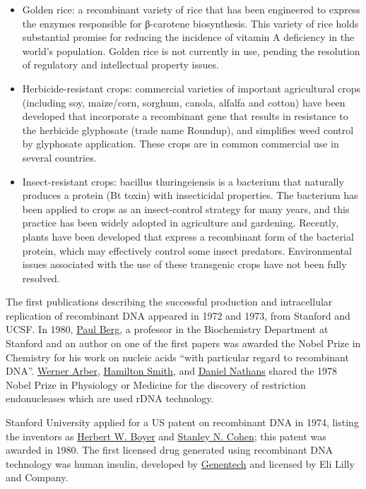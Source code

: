 \begin{itemize}
\item
  Golden rice: a recombinant variety of rice that has been engineered to express the enzymes responsible for β-carotene biosynthesis. This variety of rice holds substantial promise for reducing the incidence of vitamin A deficiency in the world's population. Golden rice is not currently in use, pending the resolution of regulatory and intellectual property issues.
\item
  Herbicide-resistant crops: commercial varieties of important agricultural crops (including soy, maize/corn, sorghum, canola, alfalfa and cotton) have been developed that incorporate a recombinant gene that results in resistance to the herbicide glyphosate (trade name Roundup), and simplifies weed control by glyphosate application. These crops are in common commercial use in several countries.
\item
  Insect-resistant crops: bacillus thuringeiensis is a bacterium that naturally produces a protein (Bt toxin) with insecticidal properties. The bacterium has been applied to crops as an insect-control strategy for many years, and this practice has been widely adopted in agriculture and gardening. Recently, plants have been developed that express a recombinant form of the bacterial protein, which may effectively control some insect predators. Environmental issues associated with the use of these transgenic crops have not been fully resolved.
\end{itemize}

The first publications describing the successful production and intracellular replication of recombinant DNA appeared in 1972 and 1973, from Stanford and UCSF. In 1980, \href{https://en.wikipedia.org/wiki/Paul_Berg}{Paul Berg}, a professor in the Biochemistry Department at Stanford and an author on one of the first papers was awarded the Nobel Prize in Chemistry for his work on nucleic acids ``with particular regard to recombinant DNA''. \href{https://en.wikipedia.org/wiki/Werner_Arber}{Werner Arber}, \href{https://en.wikipedia.org/wiki/Hamilton_O._Smith}{Hamilton Smith}, and \href{https://en.wikipedia.org/wiki/Daniel_Nathans}{Daniel Nathans} shared the 1978 Nobel Prize in Physiology or Medicine for the discovery of restriction endonucleases which are used rDNA technology.

Stanford University applied for a US patent on recombinant DNA in 1974, listing the inventors as \href{https://en.wikipedia.org/wiki/Herbert_Boyer}{Herbert W. Boyer} and \href{https://en.wikipedia.org/wiki/Stanley_Norman_Cohen}{Stanley N. Cohen}; this patent was awarded in 1980. The first licensed drug generated using recombinant DNA technology was human insulin, developed by \href{https://en.wikipedia.org/wiki/Genentech}{Genentech} and licensed by Eli Lilly and Company.

